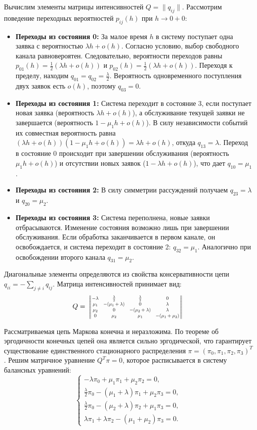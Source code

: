 \begin{eproof}
Вычислим элементы матрицы интенсивностей $Q = \|q_{ij}\|$. Рассмотрим поведение переходных вероятностей $p_{ij}(h)$ при $h \to 0+0$:

\begin{itemize}
    \item \textbf{Переходы из состояния 0:} За малое время $h$ в систему поступает одна заявка с вероятностью $\lambda h + o(h)$. Согласно условию, выбор свободного канала равновероятен. Следовательно, вероятности переходов равны $p_{01}(h) = \frac{1}{2}(\lambda h + o(h))$ и $p_{02}(h) = \frac{1}{2}(\lambda h + o(h))$. Переходя к пределу, находим $q_{01} = q_{02} = \frac{\lambda}{2}$. Вероятность одновременного поступления двух заявок есть $o(h)$, поэтому $q_{03} = 0$.
    \item \textbf{Переходы из состояния 1:} Система переходит в состояние 3, если поступает новая заявка (вероятность $\lambda h + o(h)$), а обслуживание текущей заявки не завершается (вероятность $1 - \mu_1 h + o(h)$). В силу независимости событий их совместная вероятность равна $(\lambda h + o(h))(1 - \mu_1 h + o(h)) = \lambda h + o(h)$, откуда $q_{13} = \lambda$. Переход в состояние 0 происходит при завершении обслуживания (вероятность $\mu_1 h + o(h)$) и отсутствии новых заявок ($1 - \lambda h + o(h)$), что дает $q_{10} = \mu_1$.
    \item \textbf{Переходы из состояния 2:} В силу симметрии рассуждений получаем $q_{23} = \lambda$ и $q_{20} = \mu_2$.
    \item \textbf{Переходы из состояния 3:} Система переполнена, новые заявки отбрасываются. Изменение состояния возможно лишь при завершении обслуживания. Если обработка заканчивается в первом канале, он освобождается, и система переходит в состояние 2: $q_{32} = \mu_1$. Аналогично при освобождении второго канала $q_{31} = \mu_2$.
\end{itemize}

Диагональные элементы определяются из свойства консервативности цепи $q_{ii} = -\sum_{j \neq i} q_{ij}$. Матрица интенсивностей принимает вид:
$$
Q = \mat{
    -\lambda & \frac{\lambda}{2} & \frac{\lambda}{2} & 0 \\
    \mu_1 & -(\mu_1 + \lambda) & 0 & \lambda \\
    \mu_2 & 0 & -(\mu_2 + \lambda) & \lambda \\
    0 & \mu_2 & \mu_1 & -(\mu_1 + \mu_2)
}
$$

Рассматриваемая цепь Маркова конечна и неразложима. По теореме об эргодичности конечных цепей она является сильно эргодической, что гарантирует существование единственного стационарного распределения $\pi = (\pi_0, \pi_1, \pi_2, \pi_3)^T$. Решим матричное уравнение $Q^T \pi = 0$, которое расписывается в систему балансных уравнений:
$$
\begin{cases}
    -\lambda \pi_0 + \mu_1 \pi_1 + \mu_2 \pi_2 = 0, \\
    \frac{\lambda}{2} \pi_0 - (\mu_1 + \lambda) \pi_1 + \mu_2 \pi_3 = 0, \\
    \frac{\lambda}{2} \pi_0 - (\mu_2 + \lambda) \pi_2 + \mu_1 \pi_3 = 0, \\
    \lambda \pi_1 + \lambda \pi_2 - (\mu_1 + \mu_2) \pi_3 = 0.
\end{cases}
$$


\end{eproof}
